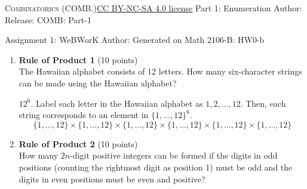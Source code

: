 \newpage\handout
{\textsc{Combinatorics (COMB.)}}{\href{https://creativecommons.org/licenses/by-nc-sa/4.0/}{CC BY-NC-SA 4.0 license}}
{Part 1: Enumeration}
{Author: \HandoutAuthor}{Release: \generatedOn}
{COMB: Part-1}

\newpage






\newpage{}
{Assignment 1: WeBWorK}
{Author: \href{\HandoutAuthorUrl}{\HandoutAuthor}}{Generated on \generatedOn}
{Math 2106-B: HW0-b}
% 







\begin{enumerate}
  \item \textbf{Rule of Product 1} (10 points)\\
  The Hawaiian alphabet consists of 12 letters. How many six-character strings can be made using the Hawaiian alphabet?
  \begin{subanswer}
    $12^6$. Label each letter in the Hawaiian alphabet as $1,2,\ldots,12$. Then, each string corresponds to an element in $\{1,\ldots,12\}^6$.
    $$
    \{1, \ldots, 12\} \times\{1, \ldots, 12\} \times\{1, \ldots, 12\} \times\{1, \ldots, 12\} \times\{1, \ldots, 12\} \times\{1, \ldots, 12\}
    $$
  \end{subanswer}

  \item \textbf{Rule of Product 2} (10 points)\\
  How many $2n$-digit positive integers can be formed if the digits in odd positions (counting the rightmost digit as position 1) must be odd and the digits in even positions must be even and positive?
  \begin{subanswer}
  \end{subanswer}


\end{enumerate}

